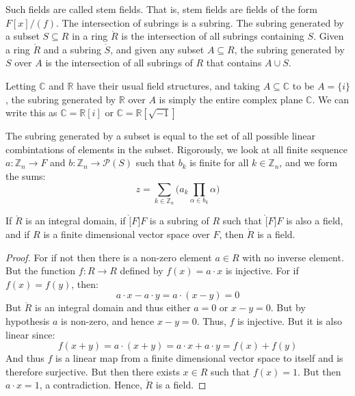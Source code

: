 \documentclass{article}                                                        %
\begin{document}
        Such fields are called stem fields. That is, stem fields are fields of
        the form $F[x]/(f)$. The intersection of subrings is a subring. The
        subring generated by a subset $S\subseteq{R}$ in a ring $\ring{R}$ is
        the intersection of all subrings containing $S$. Given a ring
        $\ring{R}$ and a subring $\ring{S}$, and given any subset
        $A\subseteq{R}$, the subring generated by $S$ over $A$ is the
        intersection of all subrings of $R$ that contains $A\cup{S}$.
        \begin{example}
            Letting $\mathbb{C}$ and $\mathbb{R}$ have their usual field
            structures, and taking $A\subseteq\mathbb{C}$ to be $A=\{i\}$, the
            subring generated by $\mathbb{R}$ over $A$ is simply the entire
            complex plane $\mathbb{C}$. We can write this as
            $\mathbb{C}=\mathbb{R}[i]$ or
            $\mathbb{C}=\mathbb{R}[\sqrt{\minus{1}}]$
        \end{example}
        The subring generated by a subset is equal to the set of all possible
        linear combintations of elements in the subset. Rigorously, we look at
        all finite sequence $a:\mathbb{Z}_{n}\rightarrow{F}$ and
        $b:\mathbb{Z}_{n}\rightarrow\mathcal{P}(S)$ such that $b_{k}$ is finite
        for all $k\in\mathbb{Z}_{n}$, and we form the sums:
        \begin{equation}
            z=\sum_{k\in\mathbb{Z}_{n}}\Big(
                a_{k}\prod_{\alpha\in{b}_{k}}\alpha
            \Big)
        \end{equation}
        \begin{theorem}
            If $\ring{R}$ is an integral domain, if $\ring[F]{F}$ is a subring
            of $R$ such that $\ring[F]{F}$ is also a field, and if $R$ is a
            finite dimensional vector space over $F$, then $\ring{R}$ is a
            field.
        \end{theorem}
        \begin{proof}
            For if not then there is a non-zero element $a\in{R}$ with no
            inverse element. But the function $f:R\rightarrow{R}$ defined by
            $f(x)=a\cdot{x}$ is injective. For if $f(x)=f(y)$, then:
            \begin{equation}
                a\cdot{x}-a\cdot{y}=a\cdot(x-y)=0
            \end{equation}
            But $\ring{R}$ is an integral domain and thus either $a=0$ or
            $x-y=0$. But by hypothesis $a$ is non-zero, and hence $x-y=0$.
            Thus, $f$ is injective. But it is also linear since:
            \begin{equation}
                f(x+y)=a\cdot(x+y)=a\cdot{x}+a\cdot{y}=f(x)+f(y)
            \end{equation}
            And thus $f$ is a linear map from a finite dimensional vector space
            to itself and is therefore surjective. But then there exists
            $x\in{R}$ such that $f(x)=1$. But then $a\cdot{x}=1$, a
            contradiction. Hence, $\ring{R}$ is a field.
        \end{proof}
\end{document}
